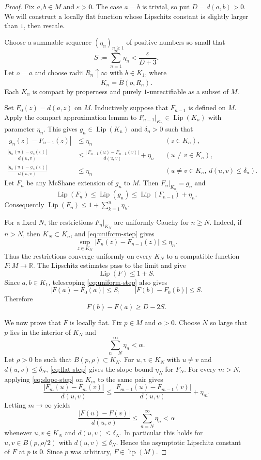 \documentclass[11pt]{amsart}
\newcommand{\lip}{\operatorname{lip}}
\newcommand{\Lip}{\operatorname{Lip}}
\newcommand{\eps}{\varepsilon}
\newcommand{\R}{\mathbb{R}}
\begin{document}
\begin{proof}
Fix $a,b\in M$ and $\eps>0$.  The case $a=b$ is trivial, so put
$D=d(a,b)>0$.  We will construct a locally flat function whose Lipschitz
constant is slightly larger than $1$, then rescale.

Choose a summable sequence $(\eta_n)_{n\geq 1}$ of positive numbers so small
that
\[
  S:=\sum_{n=1}^\infty \eta_n
  < \frac{\eps}{D+3}.
\]
Let $o=a$ and choose radii $R_n\uparrow\infty$ with $b\in K_1$, where
\[
  K_n=\overline{B}(o,R_n).
\]
Each $K_n$ is compact by properness and purely $1$-unrectifiable as a subset
of $M$.

Set $F_0(z)=d(a,z)$ on $M$.  Inductively suppose that $F_{n-1}$ is defined on
$M$.  Apply the compact approximation lemma to
$F_{n-1}|_{K_n}\in\Lip(K_n)$ with parameter $\eta_n$.  This gives
$g_n\in\Lip(K_n)$ and $\delta_n>0$ such that
\begin{align}
  |g_n(z)-F_{n-1}(z)|&\leq\eta_n &&(z\in K_n), \label{eq:uniform-step}\\
  \frac{|g_n(u)-g_n(v)|}{d(u,v)}
  &\leq
  \frac{|F_{n-1}(u)-F_{n-1}(v)|}{d(u,v)}+\eta_n
  &&(u\neq v\in K_n), \label{eq:slope-step}\\
  \frac{|g_n(u)-g_n(v)|}{d(u,v)}
  &\leq\eta_n
  &&(u\neq v\in K_n,\ d(u,v)\leq\delta_n). \label{eq:flat-step}
\end{align}
Let $F_n$ be any McShane extension of $g_n$ to $M$.  Then
$F_n|_{K_n}=g_n$ and
\[
  \Lip(F_n)\leq\Lip(g_n)\leq \Lip(F_{n-1})+\eta_n.
\]
Consequently $\Lip(F_n)\leq 1+\sum_{k=1}^n\eta_k$.

For a fixed $N$, the restrictions $F_n|_{K_N}$ are uniformly Cauchy for
$n\geq N$.  Indeed, if $n>N$, then $K_N\subset K_n$, and
\eqref{eq:uniform-step} gives
\[
  \sup_{z\in K_N}|F_n(z)-F_{n-1}(z)|\leq\eta_n.
\]
Thus the restrictions converge uniformly on every $K_N$ to a compatible
function $F:M\to\R$.  The Lipschitz estimates pass to the limit and give
\[
  \Lip(F)\leq 1+S.
\]
Since $a,b\in K_1$, telescoping \eqref{eq:uniform-step} also gives
\[
  |F(a)-F_0(a)|\leq S,\qquad |F(b)-F_0(b)|\leq S.
\]
Therefore
\[
  F(b)-F(a)\geq D-2S.
\]

We now prove that $F$ is locally flat.  Fix $p\in M$ and $\alpha>0$.  Choose
$N$ so large that $p$ lies in the interior of $K_N$ and
\[
  \sum_{n=N}^\infty \eta_n < \alpha.
\]
Let $\rho>0$ be such that $B(p,\rho)\subset K_N$.  For $u,v\in K_N$ with
$u\neq v$ and $d(u,v)\leq\delta_N$, \eqref{eq:flat-step} gives the slope bound
$\eta_N$ for $F_N$.  For every $m>N$, applying \eqref{eq:slope-step} on
$K_m$ to the same pair gives
\[
  \frac{|F_m(u)-F_m(v)|}{d(u,v)}
  \leq
  \frac{|F_{m-1}(u)-F_{m-1}(v)|}{d(u,v)}+\eta_m.
\]
Letting $m\to\infty$ yields
\[
  \frac{|F(u)-F(v)|}{d(u,v)}
  \leq \sum_{n=N}^\infty \eta_n <\alpha
\]
whenever $u,v\in K_N$ and $d(u,v)\leq\delta_N$.  In particular this holds for
$u,v\in B(p,\rho/2)$ with $d(u,v)\leq\delta_N$.  Hence the asymptotic
Lipschitz constant of $F$ at $p$ is $0$.  Since $p$ was arbitrary,
$F\in\lip(M)$.


\end{proof}
\end{document}
